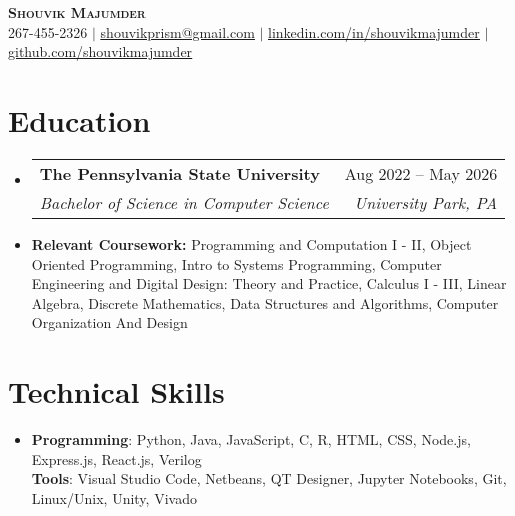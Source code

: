 \documentclass[letterpaper,11pt]{article}
\makeatletter
\newcommand{\resumeItem}[1]{
  \item\small{
    {#1 \vspace{-2pt}}
  }
}
\newcommand{\resumeSubheading}[4]{
  \vspace{-2pt}\item
    \begin{tabular*}{0.97\textwidth}[t]{l@{\extracolsep{\fill}}r}
      \textbf{#1} & #2 \\
      \textit{\small#3} & \textit{\small #4} \\
    \end{tabular*}\vspace{-7pt}
}
\newcommand{\resumeSubHeadingListStart}{\begin{itemize}[leftmargin=0.15in, label={}]}
\newcommand{\resumeSubHeadingListEnd}{\end{itemize}}
\makeatother
\begin{document}

\begin{center}
    \textbf{\Huge \scshape Shouvik Majumder} \\ \vspace{1pt}
    \small 267-455-2326 $|$ \href{shouvikprism@gmail.com}{\underline{shouvikprism@gmail.com}} $|$ 
    \href{https://www.linkedin.com/in/shouvikmajumder/}{\underline{linkedin.com/in/shouvikmajumder}} $|$  \href{https://github.com/shouvikmajumder}{\underline{github.com/shouvikmajumder}}
\end{center}


\section{Education}
  \resumeSubHeadingListStart
    \resumeSubheading
      {\textbf{The Pennsylvania State University }
}{Aug 2022 -- May 2026}
      {Bachelor of Science in Computer Science}{University Park, PA}

      \resumeItem{\textbf{Relevant Coursework: }Programming and Computation I - II, Object Oriented Programming, Intro to Systems Programming, Computer Engineering and Digital Design: Theory and Practice, Calculus I - III, Linear Algebra, Discrete Mathematics, Data Structures and Algorithms, Computer Organization And Design}
  \resumeSubHeadingListEnd


\section{Technical Skills}
  \resumeSubHeadingListStart
      \resumeItem{\textbf{Programming}{: Python, Java, JavaScript, C, R, HTML, CSS, Node.js, Express.js, React.js, Verilog} \\
     \textbf{Tools}{: Visual Studio Code, Netbeans, QT Designer, Jupyter Notebooks, Git, Linux/Unix, Unity, Vivado}}
  \resumeSubHeadingListEnd
  
\end{document}
